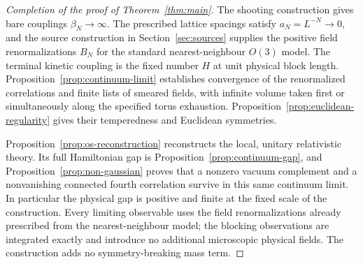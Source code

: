 \begin{proof}[Completion of the proof of Theorem~\ref{thm:main}]
The shooting construction gives bare couplings $\beta_N\to\infty$.
The prescribed lattice spacings satisfy $a_N=L^{-N}\to0$, and the
source construction in Section~\ref{sec:sources} supplies the positive
field renormalizations $B_N$ for the standard nearest-neighbour $O(3)$
model.  The terminal kinetic coupling is the fixed number $H$ at unit
physical block length.
Proposition~\ref{prop:continuum-limit} establishes convergence of the
renormalized correlations and finite lists of smeared fields, with
infinite volume taken first or simultaneously along the specified torus
exhaustion.  Proposition~\ref{prop:euclidean-regularity} gives their
temperedness and Euclidean symmetries.

Proposition~\ref{prop:os-reconstruction} reconstructs the local,
unitary relativistic theory.  Its full Hamiltonian gap is
Proposition~\ref{prop:continuum-gap}, and
Proposition~\ref{prop:non-gaussian} proves that a nonzero vacuum
complement and a nonvanishing connected fourth correlation survive in
this same continuum limit.  In particular the physical gap is positive
and finite at the fixed scale of the construction.  Every limiting
observable uses the field renormalizations already prescribed from the
nearest-neighbour model; the blocking observations are integrated
exactly and introduce no additional microscopic physical fields.  The
construction adds no symmetry-breaking mass term.
\end{proof}
